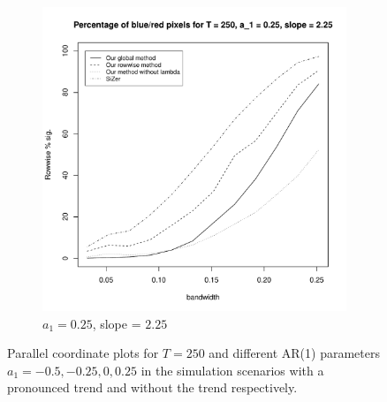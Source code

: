 \documentclass[a4paper,12pt]{article}
\begin{document}
\begin{figure}[t]
\begin{subfigure}[b]{0.475\textwidth}
\includegraphics[width=\textwidth]{Plots/rowwise_sig_comparison_T_250_a1_25_slope_225.pdf}
\caption{$a_1 = 0.25$, slope = $2.25$}
\end{subfigure}
\caption{Parallel coordinate plots for $T = 250$ and different AR(1) parameters $a_1 = -0.5, -0.25, 0, 0.25$ in the simulation scenarios with a pronounced trend and without the trend respectively.}\label{fig:PCP}
\end{figure}
\end{document}
